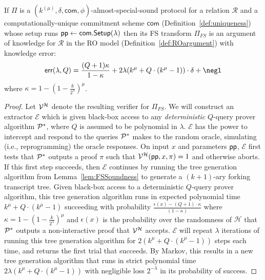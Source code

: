 \begin{theorem}
\label{thm:uniquefs}
	If $\Pi$ is a $(k^{(\mu)}, \delta, \textsf{com} , \phi)$-almost-special-sound protocol for a relation $\mathcal{R}$ and a computationally-unique commitment scheme $\textsf{com}$ (Definition~\ref{def:uniqueness}) whose setup runs $\textsf{pp} \gets \textsf{com}.\textsf{{Setup}}(\lambda)$ then its FS transform $\Pi_{FS}$ is an argument of knowledge for $\mathcal{R}$ in the RO model (Definition~\ref{def:ROargument}) with knowledge error: 
	 $$\textsf{err}(\lambda, Q) = \frac{(Q+1)\kappa}{1- \kappa}  + 2\lambda (k^\mu + Q \cdot (k^\mu - 1)) \cdot \delta + \negl
 $$ where $\kappa = 1 - (1 - \frac{k}{2^\lambda})^\mu$.
	\end{theorem}
	\begin{proof}
	Let $\mathcal{V}^\mathcal{H}$ denote the resulting verifier for $\Pi_{FS}$. We will construct an extractor $\mathcal{E}$ which is given black-box access to any \emph{deterministic} $Q$-query prover algorithm $\mathcal{P}^*$, where $Q$ is assumed to be polynomial in $\lambda$. $\mathcal{E}$ has the power to intercept and respond to the queries $\mathcal{P}^*$ makes to the random oracle, simulating (i.e., reprogramming) the oracle responses. On input $x$ and parameters $\textsf{pp}$, $\mathcal{E}$ first tests that $\mathcal{P}^*$ outputs a proof $\pi$ such that $\mathcal{V}^\mathcal{H}(\textsf{pp}, x, \pi) = 1$ and otherwise aborts. If this first step succeeds, then $\mathcal{E}$ continues by running the tree generation algorithm from Lemma~\ref{lem:FSSoundness} to generate a $(k+1)$-ary forking transcript tree. Given black-box access to a deterministic $Q$-query prover algorithm, this tree generation algorithm runs in expected polynomial time $k^\mu + Q \cdot (k^\mu - 1)$ succeeding with probability $\frac{\epsilon(x) - (Q+1) \cdot \kappa }{(1 - \kappa)}$ where $\kappa = 1 - (1 - \frac{k}{2^\lambda})^\mu$ and $\epsilon(x)$ is the probability over the randomness of $\mathcal{H}$ that $\mathcal{P}^*$ outputs a non-interactive proof that $\mathcal{V}^\mathcal{H}$ accepts. $\mathcal{E}$ will repeat $\lambda$ iterations of running this tree generation algorithm for $2 (k^\mu + Q \cdot (k^\mu - 1))$  steps each time, and returns the first trial that succeeds. By Markov, this results in a new tree generation algorithm that runs in strict polynomial time $2\lambda (k^\mu + Q \cdot (k^\mu - 1))$ with negligible loss $2^{-\lambda}$ in its probability of success.
	

\end{proof}
